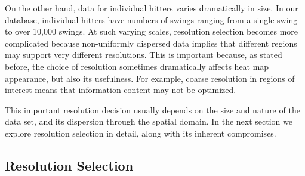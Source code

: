 On the other hand, data for individual hitters varies dramatically in size. In our database, individual hitters have numbers of swings ranging from a single swing to over 10,000 swings. At such varying scales, resolution selection becomes more complicated because non-uniformly dispersed data implies that different regions may support very different resolutions. This is important because, as stated before, the choice of resolution sometimes dramatically affects heat map appearance, but also its usefulness. For example, coarse resolution in regions of interest means that information content may not be optimized. 

This important resolution decision usually depends on the size and nature of the data set, and its dispersion through the spatial domain. In the next section we explore resolution selection in detail, along with its inherent compromises.

\subsection{Resolution Selection}

